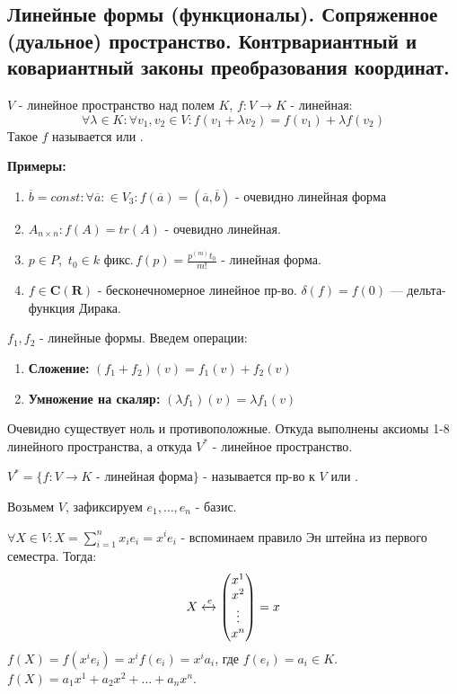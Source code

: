 \subsection{Линейные формы (функционалы). Сопряженное (дуальное) пространство. Контрвариантный и ковариантный законы преобразования координат.}

 $V$ - линейное пространство над полем $K$, $f:V \rightarrow  K$ - линейная:
$$\forall \lambda \in K: \forall  v_1,v_2 \in V: f(v_1+ \lambda v_2) = f(v_1)+ \lambda f(v_2)$$
Такое $f$ называется  или .

\textbf{Примеры:}

\begin{enumerate}
    \item $\overline{b} = const: \forall \overline{a}: \in V_3: f(\overline{a}) = (\overline{a},\overline{b})$ - очевидно линейная форма
    \item $A_{n\times n}: f(A) = tr (A)$ - очевидно линейная.
    \item $p \in P$, $\, t_0 \in k \text{ фикс.} \, f(p)= \frac{p^{(m)}t_0}{m!}$ - линейная форма.
    \item $f\in \mathbf{C}(\mathbf{R})$ - бесконечномерное линейное пр-во. $\delta(f)=f(0)$ --- дельта-функция Дирака.
\end{enumerate}

$f_1, f_2$ - линейные формы. Введем операции:
\begin{enumerate}
    \item \textbf{Сложение:} $(f_1+f_2)(v) = f_1(v) + f_2(v)$
    \item \textbf{Умножение на скаляр:}  $(\lambda f_1) (v) = \lambda f_1(v)$
\end{enumerate}
Очевидно существует ноль и противоположные. Откуда выполнены аксиомы 1-8 линейного пространства, а откуда $V^*$ - линейное пространство.

$V^* = \{f: V \rightarrow K \text{ - линейная форма}\}$ - называется  пр-во к $V$ или .

Возьмем $V$, зафиксируем  $e_1,\ldots,e_n$ - базис.

$\forall X \in V: X = \sum\limits_{i=1}^nx_i e_i = x^ie_i$ - вспоминаем правило Эн  штейна из первого семестра. Тогда:
$$X \xleftrightarrow{e}\begin{pmatrix}
    x^1 \\
    x^2 \\
    \vdots \\
    x^n
\end{pmatrix} =x$$ 
$f(X) = f(x^ie_i) = x^if(e_i) = x^ia_i$, где $f(e_i) = a_i \in K$. $f(X) = a_1x^1+a_2x^2 + \ldots + a_n x^n$.

